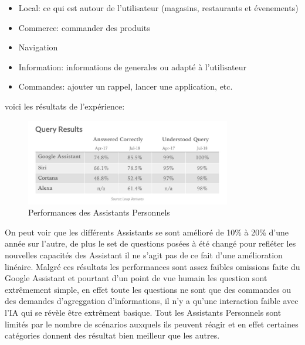\begin{itemize}
    \item Local: ce qui est autour de l'utilisateur (magasins, restaurants et évenements)
    \item Commerce: commander des produits
    \item Navigation
    \item Information: informations de generales ou adapté à l'utilisateur
    \item Commandes: ajouter un rappel, lancer une application, etc. \newline
\end{itemize}

voici les résultats de l'expérience:
\begin{figure}[h]
    \centering
    \includegraphics[width=0.8\textwidth]{Images/vaqueryresult}
    \caption{Performances des Assistants Personnels}
    \label{fig:virtualassistantqueryresult}
\end{figure}

On peut voir que les différents Assistants se sont amélioré de 10\% à 20\% d'une année sur l'autre,
de plus le set de questions posées à été changé pour refléter les nouvelles capacités des Assistant
il ne s'agit pas de ce fait d'une amélioration linéaire. Malgré ces résultats les performances
sont assez faibles omissions faite du Google Assistant et pourtant d'un point de vue
humain les question sont extrêmement simple, en effet toute les questions ne sont que des commandes ou
des demandes d'agreggation d'informations, il n'y a qu'une interaction faible avec l'IA qui se révèle
être extrêment basique. Tout les Assistants Personnels sont limités par le nombre de scénarios auxquels
ils peuvent réagir et en effet certaines catégories donnent des résultat bien meilleur que les
autres.

